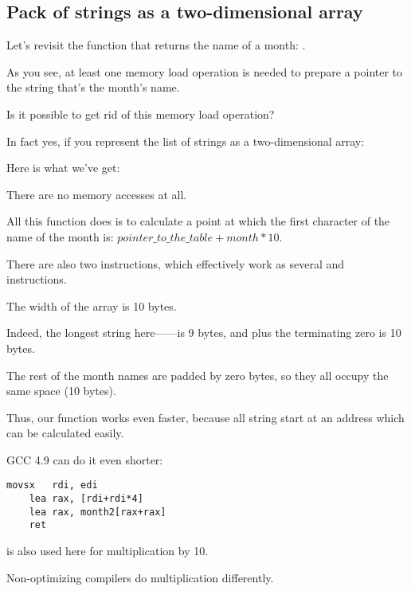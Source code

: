 \subsection{Pack of strings as a two-dimensional array}

Let's revisit the function that returns the name of a month: .

As you see, at least one memory load operation is needed to prepare a pointer to the string
that's the month's name.

Is it possible to get rid of this memory load operation?

In fact yes, if you represent the list of strings as a two-dimensional array:



Here is what we've get:



There are no memory accesses at all.

All this function does is to calculate a point at which the first character of the name of the month is: 
$pointer\_to\_the\_table + month * 10$.

There are also two \LEA instructions, which effectively work as several \MUL and \MOV instructions.

The width of the array is 10 bytes. 

Indeed, the longest string here------is 9 bytes, and plus the terminating zero is 10 bytes.

The rest of the month names are padded by zero bytes, so they all occupy the same space (10 bytes).

Thus, our function works even faster, because all string start at an address which can be
calculated easily.

\Optimizing GCC 4.9 can do it even shorter:

\begin{lstlisting}[caption=\Optimizing GCC 4.9 x64,style=customasmx86]
	movsx	rdi, edi
	lea	rax, [rdi+rdi*4]
	lea	rax, month2[rax+rax]
	ret
\end{lstlisting}

\LEA is also used here for multiplication by 10.

Non-optimizing compilers do multiplication differently.



